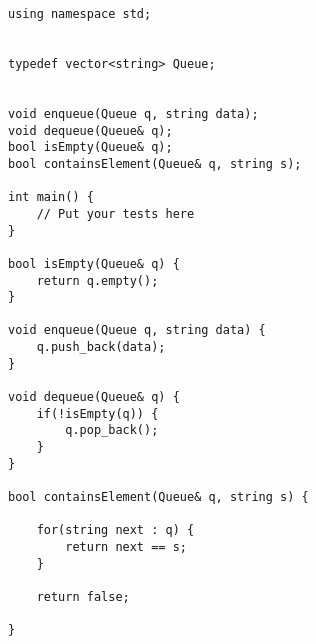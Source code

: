 \documentclass[12pt]{article}
\begin{document}
\begin{enumerate}
\begin{verbatim}
using namespace std;


typedef vector<string> Queue;


void enqueue(Queue q, string data);
void dequeue(Queue& q);
bool isEmpty(Queue& q);
bool containsElement(Queue& q, string s);

int main() {
	// Put your tests here
}

bool isEmpty(Queue& q) {
	return q.empty();
}

void enqueue(Queue q, string data) {
	q.push_back(data);
}

void dequeue(Queue& q) {
	if(!isEmpty(q)) {
		q.pop_back();
	}
}

bool containsElement(Queue& q, string s) {
		
	for(string next : q) {
		return next == s;
	}
	
	return false;
	
}
    \end{verbatim}
 \end{enumerate}
\end{document}
